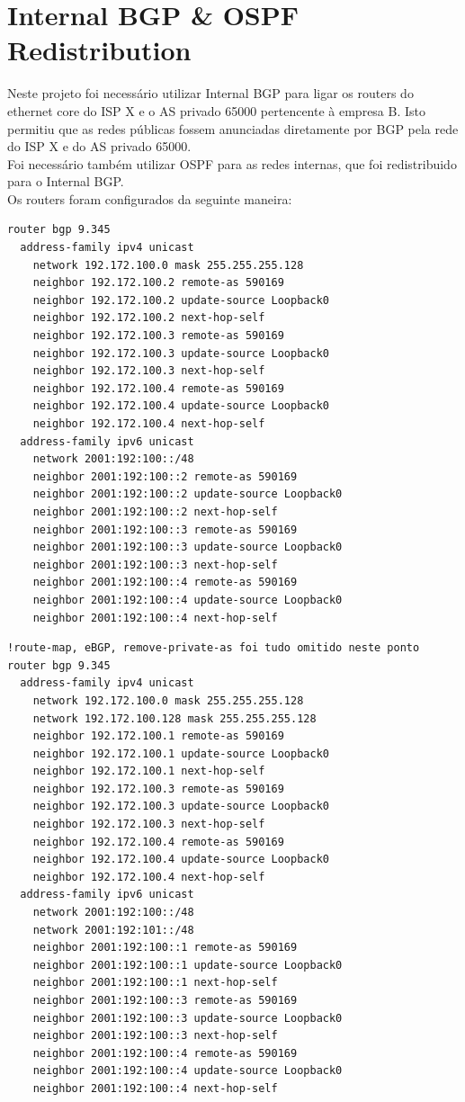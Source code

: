 \documentclass[11pt,a4paper]{report}
\begin{document}
\section{Internal BGP \& OSPF Redistribution}
Neste projeto foi necessário utilizar Internal BGP para ligar os routers do ethernet core do ISP X e o AS privado 65000 pertencente à empresa B. Isto permitiu que as redes públicas fossem anunciadas diretamente por BGP pela rede do ISP X e do AS privado 65000.\\
Foi necessário também utilizar OSPF para as redes internas, que foi redistribuido para o Internal BGP.\\
Os routers foram configurados da seguinte maneira:

\begin{lstlisting}[caption=Internal BGP - Router Porto]
router bgp 9.345
  address-family ipv4 unicast
  	network 192.172.100.0 mask 255.255.255.128
    neighbor 192.172.100.2 remote-as 590169
	neighbor 192.172.100.2 update-source Loopback0
 	neighbor 192.172.100.2 next-hop-self
 	neighbor 192.172.100.3 remote-as 590169
 	neighbor 192.172.100.3 update-source Loopback0
 	neighbor 192.172.100.3 next-hop-self
 	neighbor 192.172.100.4 remote-as 590169
 	neighbor 192.172.100.4 update-source Loopback0
  	neighbor 192.172.100.4 next-hop-self
  address-family ipv6 unicast
  	network 2001:192:100::/48
  	neighbor 2001:192:100::2 remote-as 590169
 	neighbor 2001:192:100::2 update-source Loopback0
 	neighbor 2001:192:100::2 next-hop-self
 	neighbor 2001:192:100::3 remote-as 590169
 	neighbor 2001:192:100::3 update-source Loopback0
 	neighbor 2001:192:100::3 next-hop-self
 	neighbor 2001:192:100::4 remote-as 590169
 	neighbor 2001:192:100::4 update-source Loopback0
 	neighbor 2001:192:100::4 next-hop-self
\end{lstlisting}

\begin{lstlisting}[caption=Internal BGP - Router Lisboa]
  	!route-map, eBGP, remove-private-as foi tudo omitido neste ponto
router bgp 9.345
  address-family ipv4 unicast
  	network 192.172.100.0 mask 255.255.255.128
  	network 192.172.100.128 mask 255.255.255.128
    neighbor 192.172.100.1 remote-as 590169
	neighbor 192.172.100.1 update-source Loopback0
 	neighbor 192.172.100.1 next-hop-self
 	neighbor 192.172.100.3 remote-as 590169
 	neighbor 192.172.100.3 update-source Loopback0
 	neighbor 192.172.100.3 next-hop-self
 	neighbor 192.172.100.4 remote-as 590169
 	neighbor 192.172.100.4 update-source Loopback0
  	neighbor 192.172.100.4 next-hop-self
  address-family ipv6 unicast
  	network 2001:192:100::/48
  	network 2001:192:101::/48
  	neighbor 2001:192:100::1 remote-as 590169
 	neighbor 2001:192:100::1 update-source Loopback0
 	neighbor 2001:192:100::1 next-hop-self
 	neighbor 2001:192:100::3 remote-as 590169
 	neighbor 2001:192:100::3 update-source Loopback0
 	neighbor 2001:192:100::3 next-hop-self
 	neighbor 2001:192:100::4 remote-as 590169
 	neighbor 2001:192:100::4 update-source Loopback0
 	neighbor 2001:192:100::4 next-hop-self
\end{lstlisting}
\end{document}
